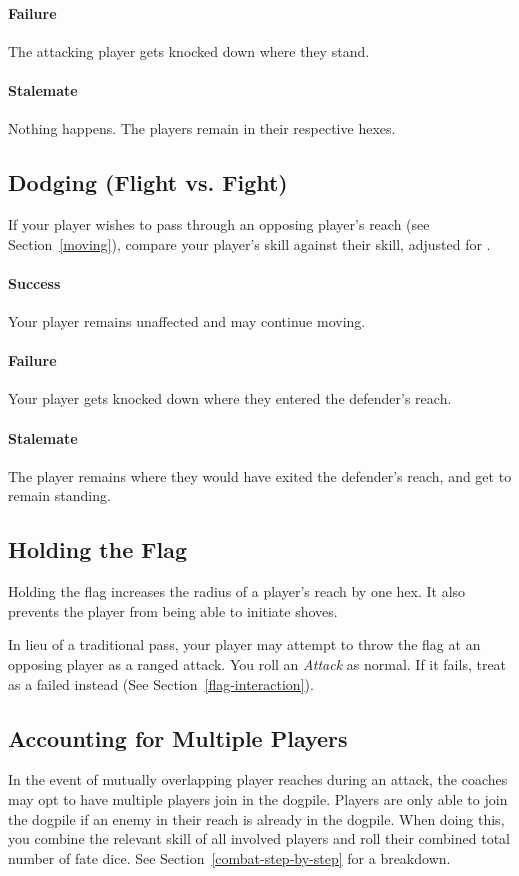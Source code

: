 \paragraph{Failure}
The attacking player gets knocked down where they stand.
\paragraph{Stalemate}
Nothing happens.
The players remain in their respective hexes.

\subsection{Dodging (Flight vs. Fight)}
If your player wishes to pass through an opposing player's reach (see Section~\ref{moving}), compare your player's \flight{} skill against their \fight{} skill, adjusted for \fate{}.

\paragraph{Success}
Your player remains unaffected and may continue moving.
\paragraph{Failure}
Your player gets knocked down where they entered the defender's reach.
\paragraph{Stalemate}
The player remains where they would have exited the defender's reach, and get to remain standing.

\subsection{Holding the Flag}
Holding the flag increases the radius of a player's reach by one hex.
It also prevents the player from being able to initiate shoves.

In lieu of a traditional pass, your player may attempt to throw the flag at an opposing player as a ranged attack.
You roll an \textit{Attack} as normal.
If it fails, treat as a failed \throw{} instead (See Section~\ref{flag-interaction}).

\subsection{Accounting for Multiple Players}\label{dogpiling}
In the event of mutually overlapping player reaches during an attack, the coaches may opt to have multiple players join in the dogpile.
Players are only able to join the dogpile if an enemy in their reach is already in the dogpile.
When doing this, you combine the relevant skill of all involved players and roll their combined total number of fate dice. 
See Section~\ref{combat-step-by-step} for a breakdown.

